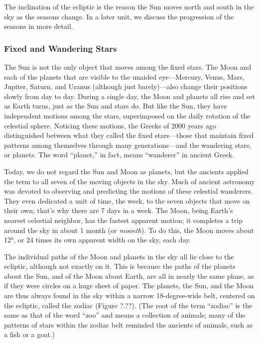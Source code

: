 \documentclass[../../main-astronomy.tex]{subfiles}
\begin{document}

\vspace{1em}

The inclination of the ecliptic is the reason the Sun moves north and south in the sky as the seasons change. In a later unit, we discuss the progression of the seasons in more detail.

\subsubsection*{Fixed and Wandering Stars}

The Sun is not the only object that moves among the fixed stars. The Moon and each of the planets that are visible to the unaided eye---Mercury, Venus, Mars, Jupiter, Saturn, and Uranus (although just barely)---also change their positions slowly from day to day. During a single day, the Moon and planets all rise and set as Earth turns, just as the Sun and stars do. But like the Sun, they have independent motions among the stars, superimposed on the daily rotation of the celestial sphere. Noticing these motions, the Greeks of 2000 years ago distinguished between what they called the fixed stars---those that maintain fixed patterns among themselves through many generations---and the wandering stars, or \gls{planets}. The word ``planet,'' in fact, means ``wanderer'' in ancient Greek.

\vspace{1em}

Today, we do not regard the Sun and Moon as planets, but the ancients applied the term to all seven of the moving objects in the sky. Much of ancient astronomy was devoted to observing and predicting the motions of these celestial wanderers. They even dedicated a unit of time, the week, to the seven objects that move on their own; that's why there are 7 days in a week. The Moon, being Earth's nearest celestial neighbor, has the fastest apparent motion; it completes a trip around the sky in about 1 month (or \textit{moonth}). To do this, the Moon moves about \ang{12}, or 24 times its own apparent width on the sky, each day.

\vspace{1em}

The individual paths of the Moon and planets in the sky all lie close to the ecliptic, although not exactly on it. This is because the paths of the planets about the Sun, and of the Moon about Earth, are all in nearly the same plane, as if they were circles on a huge sheet of paper. The planets, the Sun, and the Moon are thus always found in the sky within a narrow 18-degree-wide belt, centered on the ecliptic, called the \gls{zodiac} (Figure ?.??). (The root of the term ``zodiac'' is the same as that of the word ``zoo'' and means a collection of animals; many of the patterns of stars within the zodiac belt reminded the ancients of animals, such as a fish or a goat.)
\end{document}
